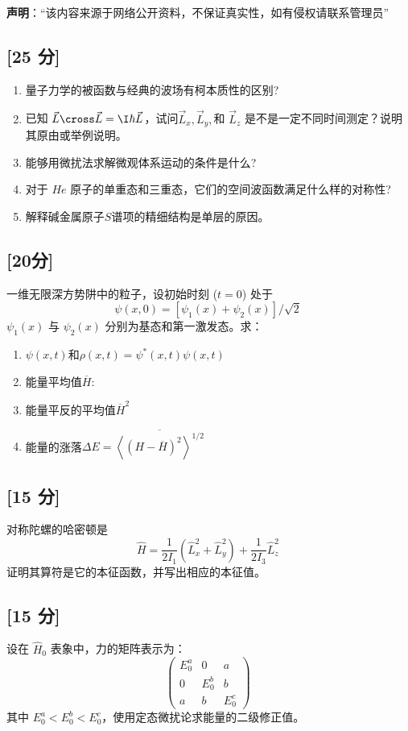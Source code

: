 
\textbf{声明}：“该内容来源于网络公开资料，不保证真实性，如有侵权请联系管理员”

\subsection{[25 分]}
\begin{enumerate}
\item 量子力学的被函数与经典的波场有柯本质性的区别?
\item 已知 $\vec L \cross \vec L = \I \hbar \vec L$，试问$\vec L_x, \vec L_y,$和 $\vec L_z$ 是不是一定不同时间测定？说明其原由或举例说明。
\item 能够用微扰法求解微观体系运动的条件是什么?
\item 对于 $He$ 原子的单重态和三重态，它们的空间波函数满足什么样的对称性?
\item 解释碱金属原子$S$谱项的精细结构是单层的原因。
\end{enumerate}
\subsection{[20分]}
一维无限深方势阱中的粒子，设初始时刻 ($t = 0$) 处于
\[
\psi(x, 0) = [\psi_1(x) + \psi_2(x)]/\sqrt{2}~
\]
$\psi_1(x)$ 与 $\psi_2(x)$ 分别为基态和第一激发态。求：
\begin{enumerate}
\item $\psi(x, t)$和$\rho(x,t) = \psi^*(x,t)\psi(x,t)$
\item 能量平均值$\overline{H} $:
\item 能量平反的平均值$\overline{H}^2 $
\item 能量的涨落$\Delta E =\overline{\left\langle \left( H - \overline{H} \right)^2\right\rangle^{1/2}}$
\end{enumerate}
\subsection{[15 分]}
对称陀螺的哈密顿是\[\hat{H} = \frac{1}{2I_1} \left( \hat{L}_x^2 + \hat{L}_y^2 \right) + \frac{1}{2I_3} \hat{L}_z^2~\]
证明其算符是它的本征函数，并写出相应的本征值。
\subsection{[15 分]}
设在 $\hat H_0$ 表象中，力的矩阵表示为：
\[
\begin{pmatrix}
E_0^a & 0 & a \\
0 & E_0^b & b \\
a & b & E_0^c
\end{pmatrix}~
\]
其中 $E_0^a < E_0^b < E_0^c$，使用定态微扰论求能量的二级修正值。
